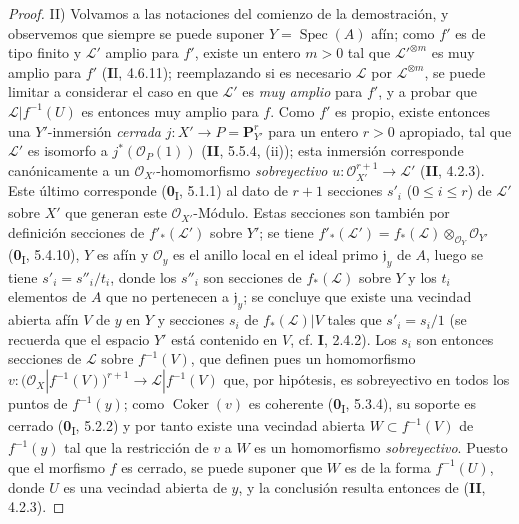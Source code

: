 \begin{proof}
\noindent II) Volvamos a las notaciones del comienzo de la demostración,
y observemos que
siempre se puede suponer $Y=\operatorname{Spec}(A)$
afín; como $f'$ es de tipo finito y $\mathcal L'$ amplio para $f'$,
existe un entero $m>0$ tal que $\mathcal L'^{\otimes m}$ es muy amplio para
$f'$ (\textbf{I}I, 4.6.11); reemplazando si es necesario $\mathcal L$ por
$\mathcal L^{\otimes m}$, se puede limitar a considerar el caso en que
$\mathcal L'$ es \emph{muy amplio} para $f'$, y a probar que
$\mathcal L|f^{-1}(U)$ es entonces muy amplio para $f$. Como $f'$ es propio,
existe entonces una $Y'$-inmersión \emph{cerrada}
$j:X'\to P=\mathbf P_{Y'}^r$ para un entero $r>0$ apropiado, tal que
$\mathcal L'$ es isomorfo a $j^*(\mathcal O_P(1))$ (\textbf{II}, 5.5.4, (ii));
esta inmersión corresponde canónicamente a un $\mathcal O_{X'}$-homomorfismo
\emph{sobreyectivo}
$u:\mathcal O_{X'}^{r+1}\longrightarrow\mathcal L'$
(\textbf{II}, 4.2.3). Este último corresponde (\textbf{0}\textsubscript{I}, 5.1.1) al dato
de $r+1$ secciones $s'_i$ ($0\leq i\leq r$) de $\mathcal L'$ sobre
$X'$ que generan este $\mathcal O_{X'}$-Módulo. Estas secciones son también por
definición secciones de $f'_*(\mathcal L')$ sobre $Y'$; se tiene
$f'_*(\mathcal L')=f_*(\mathcal L)\otimes_{\mathcal O_Y}\mathcal O_{Y'}$
(\textbf{0}\textsubscript{I}, 5.4.10), $Y$ es afín y $\mathcal O_y$ es el anillo
local en el ideal primo $\mathfrak j_y$ de $A$, luego se tiene
$s'_i=s''_i/t_i$, donde los $s''_i$ son secciones de $f_*(\mathcal L)$
sobre $Y$ y los $t_i$ elementos de $A$ que no pertenecen a
$\mathfrak j_y$; se concluye que existe una vecindad abierta afín $V$
de $y$ en $Y$ y secciones $s_i$ de $f_*(\mathcal L)|V$ tales que
$s'_i=s_i/1$ (se recuerda que el espacio $Y'$ está contenido en $V$, cf. \textbf{I},
2.4.2). Los $s_i$ son entonces secciones de $\mathcal L$ sobre
$f^{-1}(V)$, que definen pues un homomorfismo
$v:\bigl(\mathcal O_X|f^{-1}(V)\bigr)^{r+1}
\longrightarrow\mathcal L|f^{-1}(V)$
que, por hipótesis, es sobreyectivo en todos los puntos de $f^{-1}(y)$; como
$\operatorname{Coker}(v)$ es coherente (\textbf{0}\textsubscript{I}, 5.3.4), su
soporte es cerrado (\textbf{0}\textsubscript{I}, 5.2.2) y por tanto existe una
vecindad abierta $W\subset f^{-1}(V)$ de $f^{-1}(y)$ tal que la restricción
de $v$ a $W$ es un homomorfismo \emph{sobreyectivo}. Puesto que el morfismo $f$ es
cerrado, se puede suponer que $W$ es de la forma $f^{-1}(U)$, donde $U$ es una
vecindad abierta de $y$, y la conclusión resulta entonces de (\textbf{II}, 4.2.3).
\end{proof}

